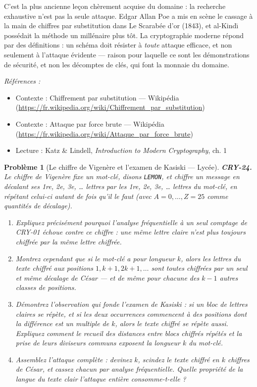 \documentclass[11pt]{article}
\newtheorem{problem}{Problème}
\newenvironment{refs}{\par\small\noindent\emph{Références :}\begin{itemize}\setlength\itemsep{0pt}}{\end{itemize}\normalsize}
\begin{document}
\noindent C'est la plus ancienne leçon chèrement acquise du domaine : la recherche
exhaustive n'est pas la seule attaque. Edgar Allan Poe a mis en scène le cassage à la main
de chiffres par substitution dans \og{} Le Scarabée d'or \fg{} (1843), et al-Kind\={\i} possédait la
méthode un millénaire plus tôt. La cryptographie moderne répond par des définitions : un
schéma doit résister à \textit{toute} attaque efficace, et non seulement à l'attaque évidente ---
raison pour laquelle ce sont les démonstrations de sécurité, et non les décomptes de clés,
qui font la monnaie du domaine.

\begin{refs}
\item Contexte : Chiffrement par substitution --- Wikipédia (\url{https://fr.wikipedia.org/wiki/Chiffrement_par_substitution})
\item Contexte : Attaque par force brute --- Wikipédia (\url{https://fr.wikipedia.org/wiki/Attaque_par_force_brute})
\item Lecture : Katz \& Lindell, \textit{Introduction to Modern Cryptography}, ch. 1
\end{refs}

\bigskip

\begin{problem}[{Le chiffre de Vigenère et l'examen de Kasiski --- Lycée}]
\textbf{CRY-24.} Le chiffre de Vigenère fixe un mot-clé, disons \texttt{LEMON}, et
chiffre un message en décalant ses 1re, 2e, 3e, \dots{} lettres
par les 1re, 2e, 3e, \dots{} lettres du mot-clé, en répétant
celui-ci autant de fois qu'il le faut (avec $A = 0, \dots, Z = 25$ comme quantités de
décalage).
\begin{enumerate}
\item[(a)] Expliquez précisément pourquoi l'analyse fréquentielle à un seul comptage de CRY-01
échoue contre ce chiffre : une même lettre claire n'est plus toujours chiffrée par la même
lettre chiffrée.
\item[(b)] Montrez cependant que si le mot-clé a pour longueur $k$, alors les lettres du texte
chiffré aux positions $1, k+1, 2k+1, \dots$ sont toutes chiffrées par un seul et même
décalage de César --- et de même pour chacune des $k-1$ autres classes de positions.
\item[(c)] Démontrez l'observation qui fonde l'examen de Kasiski : si un bloc de lettres claires se
répète, et si les deux occurrences commencent à des positions dont la différence est un
multiple de $k$, alors le texte chiffré se répète aussi. Expliquez comment le recueil des
distances entre blocs chiffrés répétés et la prise de leurs diviseurs communs exposent la
longueur $k$ du mot-clé.
\item[(d)] Assemblez l'attaque complète : devinez $k$, scindez le texte chiffré en $k$ chiffres
de César, et cassez chacun par analyse fréquentielle. Quelle propriété de la langue du texte
clair l'attaque entière consomme-t-elle ?
\end{enumerate}

\end{problem}
\end{document}
